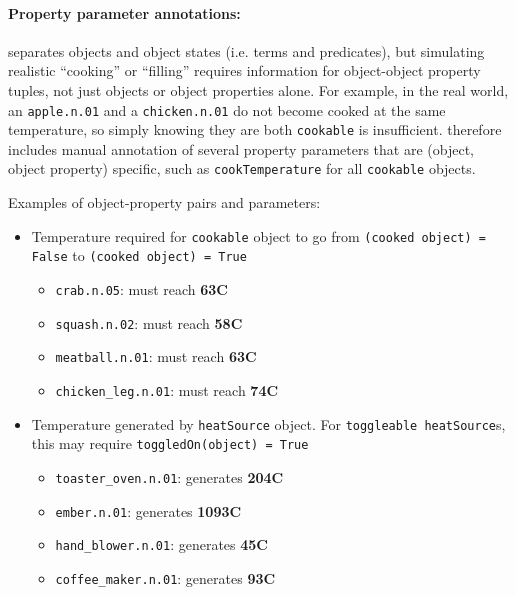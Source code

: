 

\paragraph{Property parameter annotations:} \bddl separates objects and object states (i.e. terms and predicates), but simulating realistic ``cooking'' or ``filling'' requires information for object-object property tuples, not just objects or object properties alone. For example, in the real world, an \texttt{apple.n.01} and a \texttt{chicken.n.01} do not become cooked at the same temperature, so simply knowing they are both \texttt{cookable} is insufficient. \dataset therefore includes manual annotation of several property parameters that are (object, object property) specific, such as \texttt{cookTemperature} for all \texttt{cookable} objects. 

Examples of object-property pairs and parameters:
\vspace{-2mm}
\begin{itemize}[leftmargin=2em]
    \item Temperature required for \texttt{cookable} object to go from \texttt{(cooked object) = False} to \texttt{(cooked object) = True}
    \begin{itemize}
        \item \texttt{crab.n.05}: must reach \textbf{63\textdegree C}
        \item \texttt{squash.n.02}: must reach \textbf{58\textdegree C}
         \item \texttt{meatball.n.01}: must reach \textbf{63\textdegree C}
        \item \texttt{chicken\_leg.n.01}: must reach \textbf{74\textdegree C}
    \end{itemize}
    \item Temperature generated by \texttt{heatSource} object. For \texttt{toggleable heatSource}s, this may require \texttt{toggledOn(object) = True}
    \begin{itemize}
        \item \texttt{toaster\_oven.n.01}: generates \textbf{204\textdegree C}
        \item \texttt{ember.n.01}: generates \textbf{1093\textdegree C}
        \item \texttt{hand\_blower.n.01}: generates \textbf{45\textdegree C}
        \item \texttt{coffee\_maker.n.01}: generates \textbf{93\textdegree C}
    \end{itemize}
\end{itemize}



